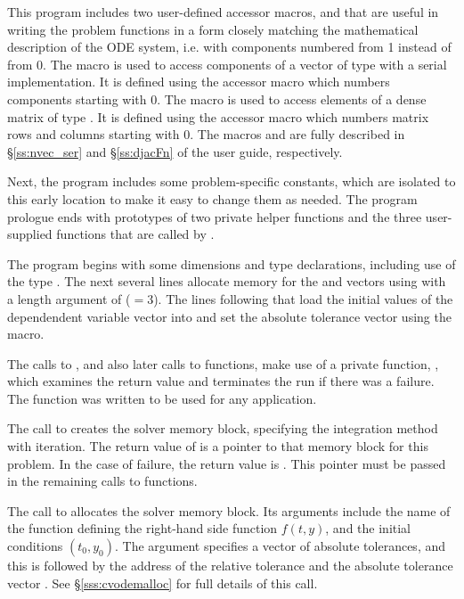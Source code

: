This program includes two user-defined accessor macros,  and
 that are useful in writing the problem functions in a form
closely matching the mathematical description of the ODE system,
i.e. with components numbered from 1 instead of from 0.  The 
macro is used to access components of a vector of type 
with a serial implementation.  It is defined using the {\nvecs}
accessor macro  which numbers components starting with
0. The  macro is used to access elements of a dense matrix of
type . It is defined using the {\dense} accessor macro
 which numbers matrix rows and columns starting with
0. The macros  and  are fully described
in \S\ref{ss:nvec_ser} and \S\ref{ss:djacFn} of the user guide,
respectively.

Next, the program includes some problem-specific constants, which are
isolated to this early location to make it easy to change them as needed.  
The program prologue ends with prototypes of two private helper
functions and the three user-supplied functions that are called by {\cvode}.

The  program begins with some dimensions and type declarations,
including use of the type .  The next several lines
allocate memory for the  and  vectors using
 with a length argument of  ($= 3$). The
lines following that load the initial values of the dependendent
variable vector into  and set the absolute tolerance vector
 using the  macro.

The calls to , and also later calls to 
functions, make use of a private function, , which examines
the return value and terminates the run if there was a failure.  The
 function was written to be used for any {\sundials}
application.

The call to  creates the {\cvode} solver memory block,
specifying the  integration method with  iteration.
The return value of is a pointer to that memory block for this
problem.  In the case of failure, the return value is .  This
pointer must be passed in the remaining calls to {\cvode} functions.

The call to  allocates the solver memory block.
Its arguments include the name of the {\C} function  defining the
right-hand side function $f(t,y)$, and the initial conditions $(t_0,y_0)$.
The argument  specifies a vector of absolute tolerances, and
this is followed by the address of the relative tolerance 
and the absolute tolerance vector .
See \S\ref{sss:cvodemalloc} for full details of this call.

